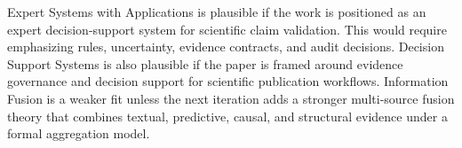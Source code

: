 Expert Systems with Applications is plausible if the work is positioned as an expert decision-support system for scientific claim validation. This would require emphasizing rules, uncertainty, evidence contracts, and audit decisions. Decision Support Systems is also plausible if the paper is framed around evidence governance and decision support for scientific publication workflows. Information Fusion is a weaker fit unless the next iteration adds a stronger multi-source fusion theory that combines textual, predictive, causal, and structural evidence under a formal aggregation model.
